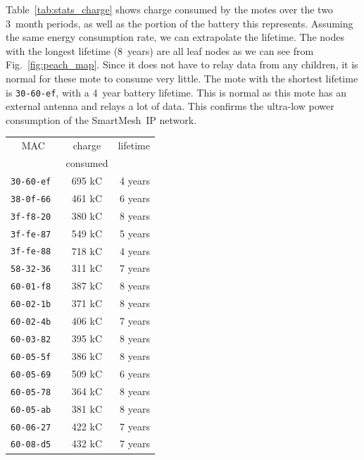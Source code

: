 \documentclass{elsarticle}
\newcommand{\smip}                {SmartMesh~IP\xspace}
\begin{document}

Table~\ref{tab:stats_charge} shows charge consumed by the motes over the two 3~month periods, as well as the portion of the battery this represents.
Assuming the same energy consumption rate, we can extrapolate the lifetime.
The nodes with the longest lifetime (8~years) are all leaf nodes as we can see from Fig.~\ref{fig:peach_map}.
Since it does not have to relay data from any children, it is normal for these mote to consume very little.
The mote with the shortest lifetime is {\tt 30-60-ef}, with a 4~year battery lifetime.
This is normal as this mote has an external antenna and relays a lot of data.
This confirms the ultra-low power consumption of the \smip network.

\begin{table}
\begin{subtable}{.5\textwidth}
    \begin{tabular}{|c|c|r|}
        \toprule
        MAC           &  charge  & lifetime \\
                      & consumed &          \\
        \midrule
        \tt{30-60-ef} &   695 kC &  4 years \\
        \tt{38-0f-66} &   461 kC &  6 years \\
        \tt{3f-f8-20} &   380 kC &  8 years \\
        \tt{3f-fe-87} &   549 kC &  5 years \\
        \tt{3f-fe-88} &   718 kC &  4 years \\
        \tt{58-32-36} &   311 kC &  7 years \\
        \tt{60-01-f8} &   387 kC &  8 years \\
        \tt{60-02-1b} &   371 kC &  8 years \\
        \tt{60-02-4b} &   406 kC &  7 years \\
        \tt{60-03-82} &   395 kC &  8 years \\
        \tt{60-05-5f} &   386 kC &  8 years \\
        \tt{60-05-69} &   509 kC &  6 years \\
        \tt{60-05-78} &   364 kC &  8 years \\
        \tt{60-05-ab} &   381 kC &  8 years \\
        \tt{60-06-27} &   422 kC &  7 years \\
        \tt{60-08-d5} &   432 kC &  7 years \\
        \bottomrule
    \end{tabular}

\end{subtable}
\end{table}
\end{document}
